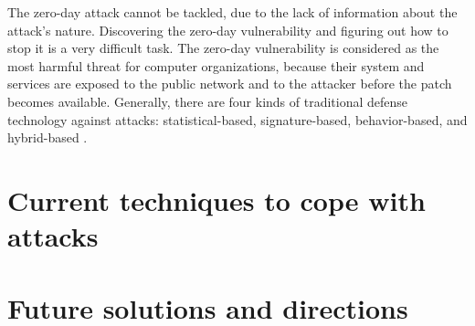 \documentclass[twocolumn]{article}
\begin{document}
The zero-day attack cannot be tackled, due to the lack of information about the attack’s nature. Discovering the zero-day vulnerability and figuring out how to stop it is a very difficult task. The zero-day vulnerability is considered as the most harmful threat for computer organizations, because their system and services are exposed to the public network and to the attacker before the patch becomes available. Generally, there are four kinds of traditional defense technology against attacks: statistical-based, signature-based, behavior-based, and hybrid-based  \cite{al2019zero}.
\section{Current techniques to cope with attacks}

\textcolor{red}{\lipsum[1]}

\section{Future solutions and directions}

\textcolor{red}{\lipsum[1]}


\renewcommand{\refname}{REFERENCES}


\end{document}
